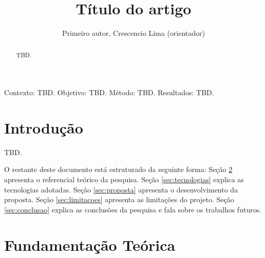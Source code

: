 \documentclass[12pt]{article}
\title{Título do artigo}
\author{Primeiro autor\inst{1}, Crescencio Lima (orientador)\inst{1} }
\newcommand{\cl}[1]{\textcolor{red}{\textbf{[Crescencio: #1]}}}
\begin{document}
 

\maketitle

\begin{abstract}
TBD.
\end{abstract}

     

\begin{resumo} 
Contexto: TBD.
Objetivo: TBD.
Método: TBD. 
Resultados: TBD.
  
\end{resumo}


\section{Introdução}

TBD.

O restante deste documento está estruturado da seguinte forma: Seção \ref{sec:referencial_teorico} apresenta o referencial teórico da pesquisa. Seção \ref{sec:tecnologias} explica as tecnologias adotadas. Seção \ref{sec:proposta} apresenta o desenvolvimento da proposta. Seção \ref{sec:limitacoes} apresenta as limitações do projeto. Seção \ref{sec:conclusao} explica as conclusões da pesquisa e fala sobre os trabalhos futuros.

\section{Fundamentação Teórica} \label{sec:referencial_teorico}


\end{document}
